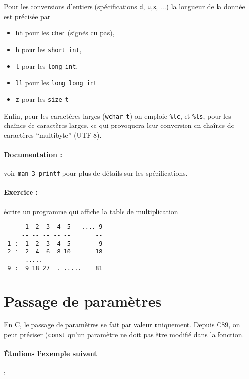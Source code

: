 \documentclass[10pt]{article}
\begin{document}
Pour les conversions d'entiers (spécifications \texttt{d},
\texttt{u},\texttt{x}, ...) la longueur de la donnée est précisée par
\begin{itemize}
\item \texttt{hh} pour les \texttt{char} (signés ou pas),
\item \texttt{h} pour les \texttt{short int},
\item \texttt{l} pour les \texttt{long int},
\item \texttt{ll} pour les \texttt{long long int}
\item \texttt{z} pour les \texttt{size\_t}
\end{itemize}

Enfin, pour les caractères larges (\texttt{wchar\_t}) on emploie
\texttt{\%lc}, et \texttt{\%ls}, pour les chaînes de caractères
larges, ce qui provoquera leur conversion en chaînes de caractères
``multibyte'' (UTF-8).
 
\paragraph{Documentation : } voir \texttt{man 3 printf} pour plus de détails sur les spécifications.

\paragraph{Exercice :} écrire un programme qui affiche 
la table de multiplication
\begin{center}
\begin{verbatim}
      1  2  3  4  5   .... 9 
     -- -- -- -- --       --
 1 :  1  2  3  4  5        9
 2 :  2  4  6  8 10       18
      .....
 9 :  9 18 27  .......    81
\end{verbatim}
\end{center}
 
\section{Passage de paramètres}

En C, le passage de paramètres se fait par valeur uniquement. Depuis
C89, on peut préciser (\texttt{const} qu'un paramètre ne doit pas être
modifié dans la fonction.

\paragraph{Étudions l'exemple suivant} :

\end{document}
